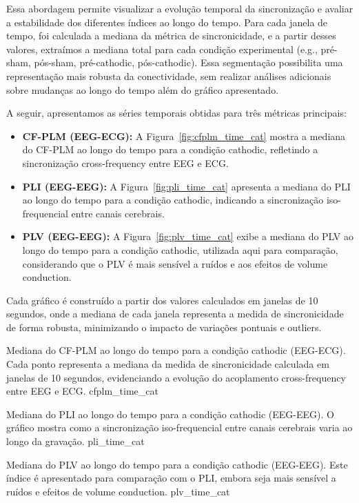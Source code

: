 Essa abordagem permite visualizar a evolução temporal da sincronização e avaliar a estabilidade dos diferentes índices ao longo do tempo. Para cada janela de tempo, foi calculada a mediana da métrica de sincronicidade, e a partir desses valores, extraímos a mediana total para cada condição experimental (e.g., pré-sham, pós-sham, pré-cathodic, pós-cathodic). Essa segmentação possibilita uma representação mais robusta da conectividade, sem realizar análises adicionais sobre mudanças ao longo do tempo além do gráfico apresentado.

A seguir, apresentamos as séries temporais obtidas para três métricas principais:

\begin{itemize}
    \item \textbf{CF-PLM (EEG-ECG):} A Figura~\ref{fig:cfplm_time_cat} mostra a mediana do CF-PLM ao longo do tempo para a condição cathodic, refletindo a sincronização cross-frequency entre EEG e ECG.
    \item \textbf{PLI (EEG-EEG):} A Figura~\ref{fig:pli_time_cat} apresenta a mediana do PLI ao longo do tempo para a condição cathodic, indicando a sincronização iso-frequencial entre canais cerebrais.
    \item \textbf{PLV (EEG-EEG):} A Figura~\ref{fig:plv_time_cat} exibe a mediana do PLV ao longo do tempo para a condição cathodic, utilizada aqui para comparação, considerando que o PLV é mais sensível a ruídos e aos efeitos de volume conduction.
\end{itemize}

Cada gráfico é construído a partir dos valores calculados em janelas de 10 segundos, onde a mediana de cada janela representa a medida de sincronicidade de forma robusta, minimizando o impacto de variações pontuais e outliers.

{Mediana do CF-PLM ao longo do tempo para a condição cathodic (EEG-ECG). Cada ponto representa a mediana da medida de sincronicidade calculada em janelas de 10 segundos, evidenciando a evolução do acoplamento cross-frequency entre EEG e ECG.}
{cfplm_time_cat}

{Mediana do PLI ao longo do tempo para a condição cathodic (EEG-EEG). O gráfico mostra como a sincronização iso-frequencial entre canais cerebrais varia ao longo da gravação.}
{pli_time_cat}

{Mediana do PLV ao longo do tempo para a condição cathodic (EEG-EEG). Este índice é apresentado para comparação com o PLI, embora seja mais sensível a ruídos e efeitos de volume conduction.}
{plv_time_cat}
